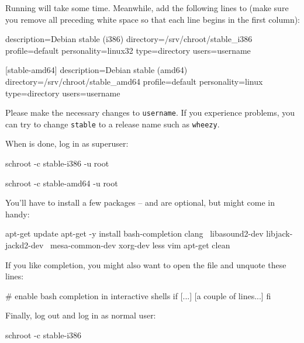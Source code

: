Running  will take some time.  Meanwhile, add the
following lines to  (make sure you
remove all preceding white space so that each line begins in the first
column):

\begin{VerbatimBoth}
  [stable-i386]
  description=Debian stable (i386)
  directory=/srv/chroot/stable_i386
  profile=default
  personality=linux32
  type=directory
  users=username

  [stable-amd64]
  description=Debian stable (amd64)
  directory=/srv/chroot/stable_amd64
  profile=default
  personality=linux
  type=directory
  users=username
\end{VerbatimBoth}

Please make the necessary changes to \texttt{username}.  If you
experience problems, you can try to change \texttt{stable} to a
release name such as \texttt{wheezy}.

When  is done, log in as superuser:

\begin{Verbatim32}
  schroot -c stable-i386 -u root
\end{Verbatim32}

\begin{Verbatim64}
  schroot -c stable-amd64 -u root
\end{Verbatim64}

You'll have to install a few packages --  and 
are optional, but might come in handy:

\begin{VerbatimBoth}
  apt-get update
  apt-get -y install bash-completion clang \
    libasound2-dev libjack-jackd2-dev \
    mesa-common-dev xorg-dev less vim
  apt-get clean
\end{VerbatimBoth}

If you like  completion, you might also want to open the
file  and unquote these lines:

\begin{VerbatimBoth}
  # enable bash completion in interactive shells
  if [...]
    [a couple of lines...]
  fi
\end{VerbatimBoth}

Finally, log out and log in as normal user:

\begin{Verbatim32}
  schroot -c stable-i386
\end{Verbatim32}

